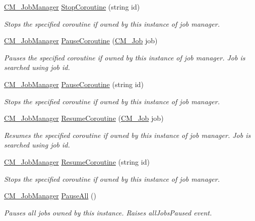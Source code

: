\begin{DoxyCompactItemize}
\hyperlink{class_c_m___job_manager}{C\+M\+\_\+\+Job\+Manager} \hyperlink{class_c_m___job_manager_ae5f0aba4e929269d10659a7b19579b7d}{Stop\+Coroutine} (string id)
\begin{DoxyCompactList}\small\item\em Stops the specified coroutine if owned by this instance of job manager. \end{DoxyCompactList}\item 
\hyperlink{class_c_m___job_manager}{C\+M\+\_\+\+Job\+Manager} \hyperlink{class_c_m___job_manager_a4d5891acec719e1003dc762df52a931a}{Pause\+Coroutine} (\hyperlink{class_c_m___job}{C\+M\+\_\+\+Job} job)
\begin{DoxyCompactList}\small\item\em Pauses the specified coroutine if owned by this instance of job manager. Job is searched using job id. \end{DoxyCompactList}\item 
\hyperlink{class_c_m___job_manager}{C\+M\+\_\+\+Job\+Manager} \hyperlink{class_c_m___job_manager_ae04090c1ecd34beb61a00f44d239b5f7}{Pause\+Coroutine} (string id)
\begin{DoxyCompactList}\small\item\em Stops the specified coroutine if owned by this instance of job manager. \end{DoxyCompactList}\item 
\hyperlink{class_c_m___job_manager}{C\+M\+\_\+\+Job\+Manager} \hyperlink{class_c_m___job_manager_a18f956a6db3fe89f4597c317838ab073}{Resume\+Coroutine} (\hyperlink{class_c_m___job}{C\+M\+\_\+\+Job} job)
\begin{DoxyCompactList}\small\item\em Resumes the specified coroutine if owned by this instance of job manager. Job is searched using job id. \end{DoxyCompactList}\item 
\hyperlink{class_c_m___job_manager}{C\+M\+\_\+\+Job\+Manager} \hyperlink{class_c_m___job_manager_a4038c3f395f2a64c3b4e18680d0a50ef}{Resume\+Coroutine} (string id)
\begin{DoxyCompactList}\small\item\em Stops the specified coroutine if owned by this instance of job manager. \end{DoxyCompactList}\item 
\hyperlink{class_c_m___job_manager}{C\+M\+\_\+\+Job\+Manager} \hyperlink{class_c_m___job_manager_ab1e48755bb929871595acfca595ae01b}{Pause\+All} ()
\begin{DoxyCompactList}\small\item\em Pauses all jobs owned by this instance. Raises all\+Jobs\+Paused event. \end{DoxyCompactList}\item 

\end{DoxyCompactItemize}
